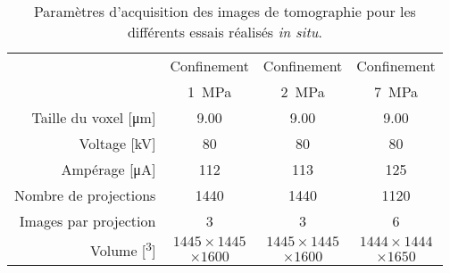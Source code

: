 		\begin{table}\centering
			\begin{tabular}{rccc}
				\cline{2-4}
				& Confinement & Confinement & Confinement\\
				& \SI{1}{\mega\pascal} & \SI{2}{\mega\pascal} & \SI{7}{\mega\pascal}\\\hline
				Taille du voxel [\si{\micro\meter}] & 9.00 & 9.00 & 9.00 \\\hline
				Voltage [\si{\kilo\volt}] & 80 & 80 & 80 \\\hline
				Ampérage [\si{\micro\ampere}] & 112 & 113 & 125 \\\hline
				Nombre de projections & 1440 & 1440 & 1120 \\\hline
				Images par projection & 3 & 3 & 6 \\\hline
				\multirow{2}{*}{Volume [\si{\voxel^3}]} & $1445\times 1445$ & $1445\times 1445$ & $1444\times 1444$ \\
				& $\times 1600$ & $\times 1600$ & $\times 1650$ \\\hline
			\end{tabular}
			\caption{\label{tab04:param_tomo}Paramètres d'acquisition des images de tomographie pour les différents essais réalisés \textit{in situ}.}
		\end{table}
